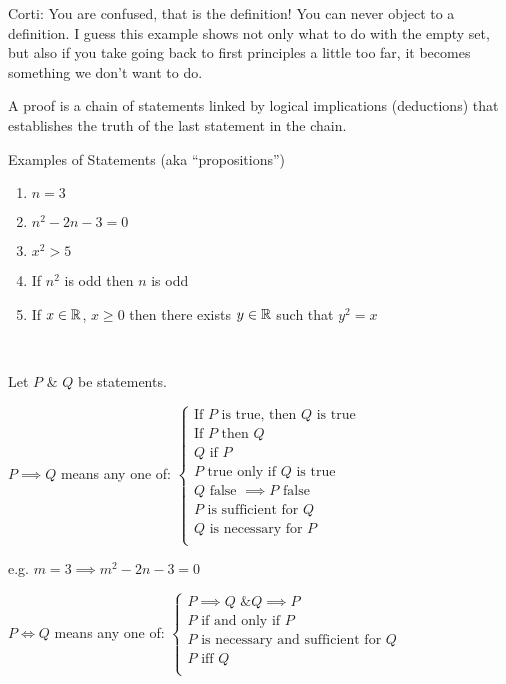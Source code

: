 \documentclass[twoside]{scrartcl}
\begin{document}
Corti: You are confused, that is the definition! You can never object to a definition. I guess this example shows not only what to do with the empty set, but also if you take going back to first principles a little too far, it becomes something we don't want to do. 


A proof is a chain of statements linked by logical implications (deductions) that establishes the truth of the last statement in the chain.\\

\begin{examples}
Examples of Statements (aka	``propositions'')
\begin{enumerate}
\item $n = 3$
\item $n^2 - 2n - 3 = 0$
\item $x^2 > 5$
\item If $n^2$ is odd then $n$ is odd
\item If $x \in\mathbb{R}$, $x\geq 0$ then there exists $y \in\mathbb{R}$ such that $y^2 = x$	
\end{enumerate}
\end{examples}~



Let $P$ \& $Q$ be statements.
\begin{center}
$P \implies Q$ means any one of: 
$\begin{cases}
 \text{If } P \text{ is true, then } Q \text{ is true}\\ 
 \text{If } P \text{ then } Q\\
 Q \text{ if } P\\
 P \text{ true only if } Q \text{ is true}\\
 Q \text{ false } \implies P \mbox{ false }\\
 P \text{ is sufficient for } Q\\
 Q \text{ is necessary for } P\\
\end{cases}
$\\
\end{center}

e.g. $m =3 \implies m^2 - 2n - 3 = 0$\\

\begin{center}
$P \iff Q$ means any one of: 
$\begin{cases}
 P \implies Q \text{ \& } Q \implies P\\
 P \text{ if and only if } P\\
 P \text{ is necessary and sufficient for } Q\\
 P \text{ iff } Q\\

\end{cases}
$\\
\end{center}
\end{document}
